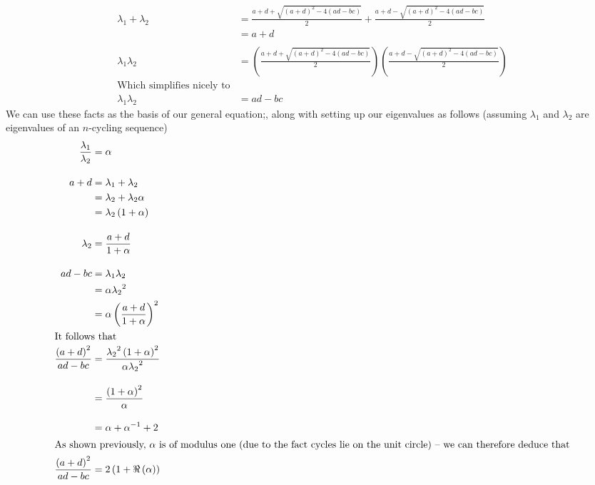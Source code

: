 \documentclass[12pt]{article}
\begin{document}
\begin{equation*}
	\begin{split}
		\lambda_1+\lambda_2               & =\frac{a+d+\sqrt{(a+d)^2-4(ad-bc)}}{2}+\frac{a+d-\sqrt{(a+d)^2-4(ad-bc)}}{2}                          \\
		                                  & =a+d                                                                                                  \\
		                                  &                                                                                                       \\
		\lambda_1\lambda_2                & =\left(\frac{a+d+\sqrt{(a+d)^2-4(ad-bc)}}{2}\right)\left(\frac{a+d-\sqrt{(a+d)^2-4(ad-bc)}}{2}\right) \\
		\text{Which simplifies nicely to} &                                                                                                       \\[10pt]
		\lambda_1\lambda_2                & =ad-bc
	\end{split}
\end{equation*}
We can use these facts as the basis of our general equation;, along with setting up our eigenvalues as follows (assuming $\lambda_1$ and $\lambda_2$ are eigenvalues of an $n$-cycling sequence)
	\begin{align*}
		\frac{\lambda_1}{\lambda_2}      & =\alpha                                                           \\[10pt]
		a+d                              & =\lambda_1+\lambda_2                                              \\
		                                 & =\lambda_2+\lambda_2\alpha                                        \\
		                                 & =\lambda_2\left(1+\alpha\right)                                   \\[10pt]
		\lambda_2                        & =\frac{a+d}{1+\alpha}                                             \\[10pt]
		ad-bc                            & =\lambda_1\lambda_2                                               \\
		                                 & =\alpha{\lambda_2}^2                                              \\
		                                 & =\alpha\left(\frac{a+d}{1+\alpha}\right)^2                        \\ \intertext{It follows that}
		\frac{\left(a+d\right)^2}{ad-bc} & =\frac{{\lambda_2}^2\left(1+\alpha\right)^2}{\alpha{\lambda_2}^2} \\[10pt]
		                                 & =\frac{\left(1+\alpha\right)^2}{\alpha}                           \\[10pt]
		                                 & =\alpha+\alpha^{-1}+2                                             \\ \intertext{As shown previously, $\alpha$ is of modulus one (due to the fact cycles lie on the unit circle) -- we can therefore deduce that}
		\frac{\left(a+d\right)^2}{ad-bc} & =2\left(1+\Re\left({\alpha}\right)\right)
	\end{align*}
\end{document}
